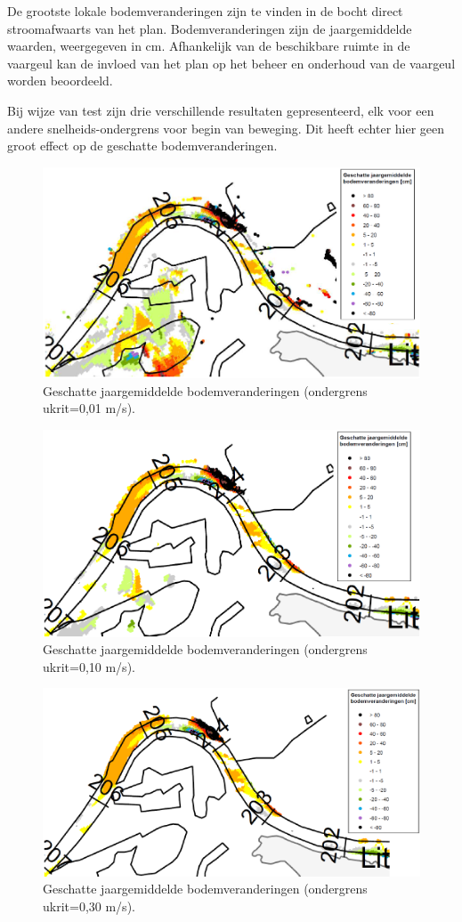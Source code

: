 De grootste lokale bodemveranderingen zijn te vinden in de bocht direct stroomafwaarts van het plan.
Bodemveranderingen zijn de jaargemiddelde waarden, weergegeven in cm.
Afhankelijk van de beschikbare ruimte in de vaargeul kan de invloed van het plan op het beheer en onderhoud van de vaargeul worden beoordeeld.

Bij wijze van test zijn drie verschillende resultaten gepresenteerd, elk voor een andere snelheids-ondergrens voor begin van beweging.
Dit heeft echter hier geen groot effect op de geschatte bodemveranderingen.

\begin{figure}
\includegraphics[width=\columnwidth]{figures/Fig14a.png}
\caption{Geschatte jaargemiddelde bodemveranderingen (ondergrens ukrit=0,01 m/s).}
\label{Fig14a}
\end{figure}

\begin{figure}
\includegraphics[width=\columnwidth]{figures/Fig14b.png}
\caption{Geschatte jaargemiddelde bodemveranderingen (ondergrens ukrit=0,10 m/s).}
\label{Fig14b}
\end{figure}

\begin{figure}
\includegraphics[width=\columnwidth]{figures/Fig14c.png}
\caption{Geschatte jaargemiddelde bodemveranderingen (ondergrens ukrit=0,30 m/s).}
\label{Fig14c}
\end{figure}
